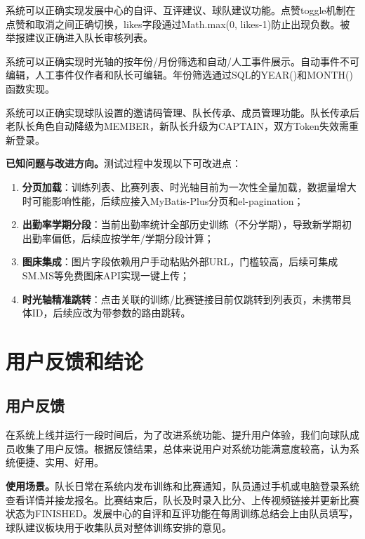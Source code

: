 \documentclass[12pt,a4paper]{ctexart}
\begin{document}
系统可以正确实现发展中心的自评、互评建议、球队建议功能。点赞toggle机制在点赞和取消之间正确切换，likes字段通过Math.max(0, likes-1)防止出现负数。被举报建议正确进入队长审核列表。

系统可以正确实现时光轴的按年份/月份筛选和自动/人工事件展示。自动事件不可编辑，人工事件仅作者和队长可编辑。年份筛选通过SQL的YEAR()和MONTH()函数实现。

系统可以正确实现球队设置的邀请码管理、队长传承、成员管理功能。队长传承后老队长角色自动降级为MEMBER，新队长升级为CAPTAIN，双方Token失效需重新登录。

\textbf{已知问题与改进方向。}测试过程中发现以下可改进点：
\begin{enumerate}[label=(\arabic*)]
\item \textbf{分页加载}：训练列表、比赛列表、时光轴目前为一次性全量加载，数据量增大时可能影响性能，后续应接入MyBatis-Plus分页和el-pagination；
\item \textbf{出勤率学期分段}：当前出勤率统计全部历史训练（不分学期），导致新学期初出勤率偏低，后续应按学年/学期分段计算；
\item \textbf{图床集成}：图片字段依赖用户手动粘贴外部URL，门槛较高，后续可集成SM.MS等免费图床API实现一键上传；
\item \textbf{时光轴精准跳转}：点击关联的训练/比赛链接目前仅跳转到列表页，未携带具体ID，后续应改为带参数的路由跳转。
\end{enumerate}


\newpage
\section{用户反馈和结论}

\subsection{用户反馈}

在系统上线并运行一段时间后，为了改进系统功能、提升用户体验，我们向球队成员收集了用户反馈。根据反馈结果，总体来说用户对系统功能满意度较高，认为系统便捷、实用、好用。

\textbf{使用场景。}队长日常在系统内发布训练和比赛通知，队员通过手机或电脑登录系统查看详情并接龙报名。比赛结束后，队长及时录入比分、上传视频链接并更新比赛状态为FINISHED。发展中心的自评和互评功能在每周训练总结会上由队员填写，球队建议板块用于收集队员对整体训练安排的意见。
\end{document}
